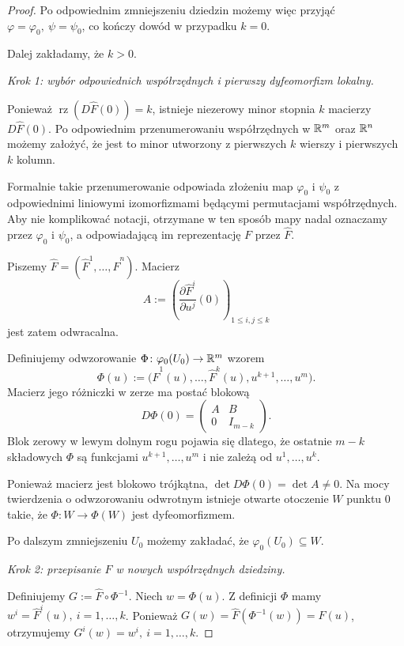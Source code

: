 \begin{proof}
Po odpowiednim zmniejszeniu dziedzin możemy więc przyjąć $\varphi=\varphi_0, \ \psi=\psi_0$,
co kończy dowód w przypadku $k=0$.

Dalej zakładamy, że $k>0$.

\medskip
\emph{Krok 1: wybór odpowiednich współrzędnych i pierwszy
dyfeomorfizm lokalny.}

Ponieważ $\operatorname{rz}(D\widehat F(0))=k$,
istnieje niezerowy minor stopnia $k$ macierzy $D\widehat F(0)$.
Po odpowiednim przenumerowaniu współrzędnych w $\mathbb{R}^m$ oraz $\mathbb{R}^n$
możemy założyć, że jest to minor utworzony z pierwszych $k$
wierszy i pierwszych $k$ kolumn.

Formalnie takie przenumerowanie odpowiada złożeniu map
$\varphi_0$ i $\psi_0$ z odpowiednimi liniowymi izomorfizmami
będącymi permutacjami współrzędnych. Aby nie komplikować notacji,
otrzymane w ten sposób mapy nadal oznaczamy przez
$\varphi_0$ i $\psi_0$, a odpowiadającą im reprezentację $F$
przez $\widehat F$.

Piszemy $\widehat F = (\widehat F^1,\dots,\widehat F^n)$.
Macierz
\[
A := \left( \frac{\partial\widehat F^i}{\partial u^j}(0) \right)_{1\leq i,j\leq k}
\]
jest zatem odwracalna.

Definiujemy odwzorowanie $\Phi\colon\varphi_0(U_0)\to\mathbb{R}^m$
wzorem
\[
\Phi(u) := \bigl( \widehat F^1(u),\dots,\widehat F^k(u), u^{k+1},\dots,u^m \bigr).
\]
Macierz jego różniczki w zerze ma postać blokową
\[
D\Phi(0)
=
\begin{pmatrix}
A&B\\
0&I_{m-k}
\end{pmatrix}.
\]
Blok zerowy w lewym dolnym rogu pojawia się dlatego, że ostatnie
$m-k$ składowych $\Phi$ są funkcjami $u^{k+1},\dots,u^m$
i nie zależą od $u^1,\dots,u^k$.

Ponieważ macierz jest blokowo trójkątna, $\det D\Phi(0) = \det A\neq0$.
Na mocy twierdzenia o odwzorowaniu odwrotnym istnieje otwarte
otoczenie $W$ punktu $0$ takie, że $\Phi\colon W\longrightarrow\Phi(W)$
jest dyfeomorfizmem.

Po dalszym zmniejszeniu $U_0$ możemy zakładać, że $\varphi_0(U_0)\subseteq W$.

\medskip
\emph{Krok 2: przepisanie $\widehat F$ w nowych współrzędnych
dziedziny.}

Definiujemy $G := \widehat F\circ\Phi^{-1}$.
Niech $w=\Phi(u)$.
Z definicji $\Phi$ mamy $w^i=\widehat F^i(u), \ i=1,\dots,k$.
Ponieważ $G(w) = \widehat F(\Phi^{-1}(w)) = \widehat F(u)$,
otrzymujemy $G^i(w)=w^i, \ i=1,\dots,k$.


\end{proof}
